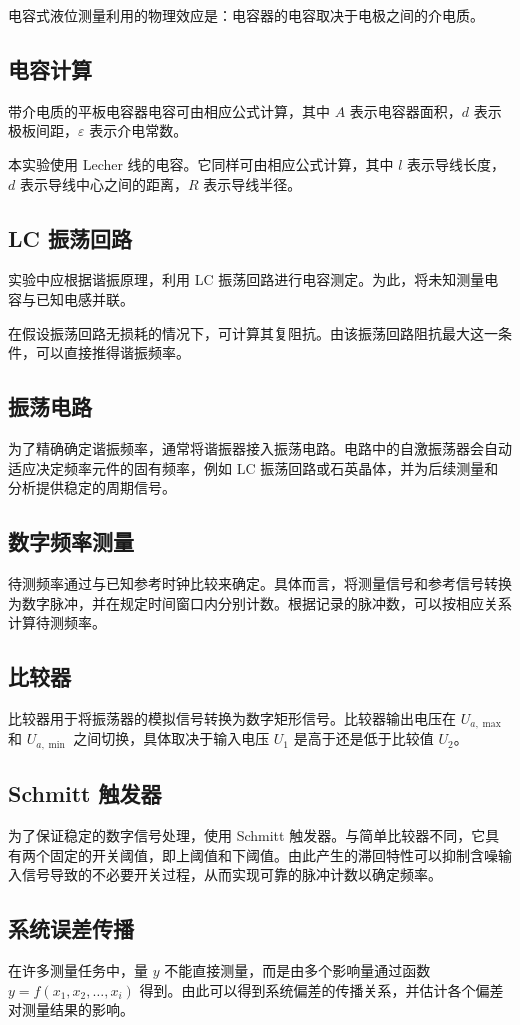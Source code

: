 电容式液位测量利用的物理效应是：电容器的电容取决于电极之间的介电质。

\subsection{电容计算}

带介电质的平板电容器电容可由相应公式计算，其中 $A$ 表示电容器面积，$d$ 表示极板间距，$\varepsilon$ 表示介电常数。

本实验使用 Lecher 线的电容。它同样可由相应公式计算，其中 $l$ 表示导线长度，$d$ 表示导线中心之间的距离，$R$ 表示导线半径。

\subsection{LC 振荡回路}

实验中应根据谐振原理，利用 LC 振荡回路进行电容测定。为此，将未知测量电容与已知电感并联。

在假设振荡回路无损耗的情况下，可计算其复阻抗。由该振荡回路阻抗最大这一条件，可以直接推得谐振频率。

\subsection{振荡电路}

为了精确确定谐振频率，通常将谐振器接入振荡电路。电路中的自激振荡器会自动适应决定频率元件的固有频率，例如 LC 振荡回路或石英晶体，并为后续测量和分析提供稳定的周期信号。

\subsection{数字频率测量}

待测频率通过与已知参考时钟比较来确定。具体而言，将测量信号和参考信号转换为数字脉冲，并在规定时间窗口内分别计数。根据记录的脉冲数，可以按相应关系计算待测频率。

\subsection{比较器}

比较器用于将振荡器的模拟信号转换为数字矩形信号。比较器输出电压在 $U_{a,\max}$ 和 $U_{a,\min}$ 之间切换，具体取决于输入电压 $U_1$ 是高于还是低于比较值 $U_2$。

\subsection{Schmitt 触发器}

为了保证稳定的数字信号处理，使用 Schmitt 触发器。与简单比较器不同，它具有两个固定的开关阈值，即上阈值和下阈值。由此产生的滞回特性可以抑制含噪输入信号导致的不必要开关过程，从而实现可靠的脉冲计数以确定频率。

\subsection{系统误差传播}

在许多测量任务中，量 $y$ 不能直接测量，而是由多个影响量通过函数 $y = f(x_1, x_2, \ldots, x_i)$ 得到。由此可以得到系统偏差的传播关系，并估计各个偏差对测量结果的影响。
